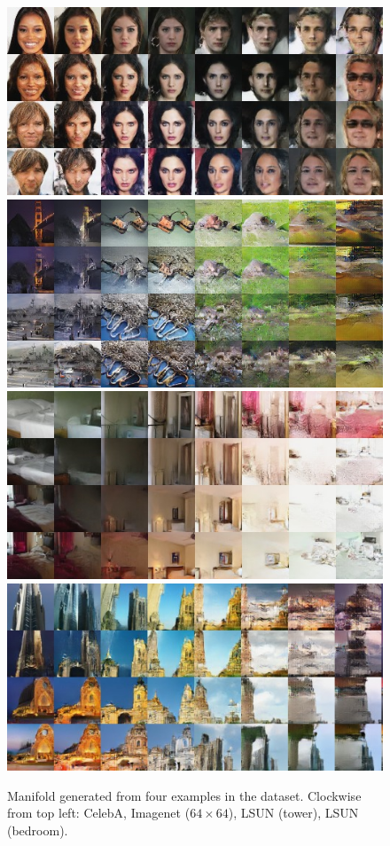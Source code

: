 \documentclass{article}
\begin{document}
\begin{figure}
\begin{center}
    \includegraphics[width=.47\textwidth]{fig_celeba_manifold.jpg} \hfill
    \includegraphics[width=.47\textwidth]{fig_imnet_64_manifold.jpg} \\\vspace{1mm}
    \includegraphics[width=.47\textwidth]{fig_bedroom_manifold.jpg} \hfill
    \includegraphics[width=.47\textwidth]{fig_tower_manifold.jpg}
\end{center}
    \caption{Manifold generated from four examples in the dataset. Clockwise from top left: CelebA, Imagenet ($64 \times 64$), LSUN (tower), LSUN (bedroom).}
    \label{fig:manifold}
\end{figure}
\end{document}
